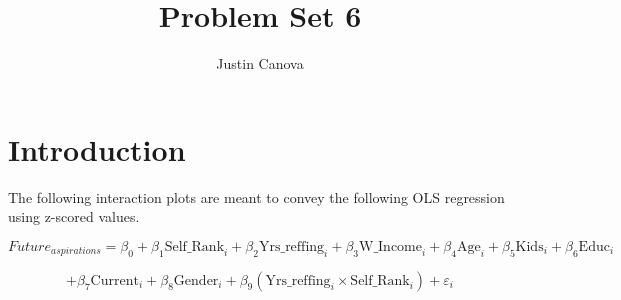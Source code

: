 \documentclass{article}
\title{Problem Set 6}
\author{Justin Canova}
\begin{document}
\maketitle

\section{Introduction}

The following interaction plots are meant to convey the following OLS regression using z-scored values.

\begin{equation}
    Future_{aspirations} = \beta_0 + \beta_1 \text{Self\_Rank}_i + \beta_2 \text{Yrs\_reffing}_i + \beta_3 \text{W\_Income}_i + \beta_4 \text{Age}_i + \beta_5 \text{Kids}_i + \beta_6 \text{Educ}_i 
\end{equation}

\begin{equation}
    + \beta_7 \text{Current}_i + \beta_8 \text{Gender}_i + \beta_9 (\text{Yrs\_reffing}_i \times \text{Self\_Rank}_i) + \varepsilon_i
\end{equation}
\end{document}
